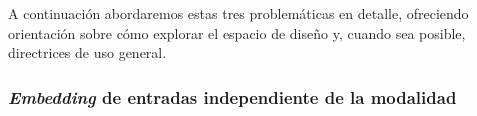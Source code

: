 \documentclass[../../book-main_es.tex]{subfiles}
\begin{document}
A continuación abordaremos estas tres problemáticas en detalle, ofreciendo orientación sobre cómo
explorar el espacio de diseño y, cuando sea posible, directrices de uso general.

\subsubsection{\textit{Embedding} de entradas independiente de la modalidad}



\end{document}
